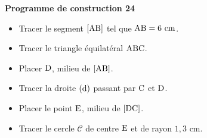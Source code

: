 \documentclass[exercice,a4]{thedocument}%
\begin{document}
%
\noindent\textbf{Programme de construction 24}\par\smallskip\noindent
\begin{itemize}
    \item Tracer le segment $[\text{AB}]$ tel que
    $\text{AB}=6\text{ cm}$.
    \item Tracer le triangle équilatéral $\text{ABC}$.
    \item Placer $\text{D}$, milieu de $[\text{AB}]$.
    \item Tracer la droite $(\text{d})$ passant par
    $\text{C}$ et $\text{D}$.
    \item Placer le point $\text{E}$, milieu de $[\text{DC}]$.
    \item Tracer le cercle $\mathcal{C}$ de centre $\text{E}$ et de
    rayon $1{,}3\text{ cm}$.
\end{itemize}
\end{document}
